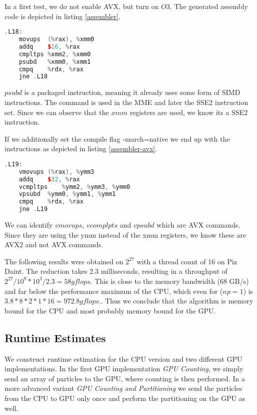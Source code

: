 \documentclass[]{article}
\begin{document}
In a first test, we do not enable AVX, but turn on $O3$. The generated assembly code is depicted in listing \ref{assembler}.

\begin{lstlisting}[language=c++, caption=Reduction Assembler Code without AVX, label=assembler]
.L18:
	movups	(%rax), %xmm0
	addq	$16, %rax
	cmpltps	%xmm2, %xmm0
	psubd	%xmm0, %xmm1
	cmpq	%rdx, %rax
	jne	.L18

\end{lstlisting}

$psubd$ is a packaged instruction, meaning it already uses some form of SIMD instructions. The command is used in the MME and later the SSE2 instruction set. Since we can observe that the $xmm$ registers are used, we know its a SSE2 instruction. 

If we additionally set the compile flag -march=native we end up with the instructions as depicted in listing \ref{assembler-avx}.

\begin{lstlisting}[language=c++, caption=Reduction Assembler Code with AVX2, label=assembler-avx]
.L19:
	vmovups	(%rax), %ymm3
	addq	$32, %rax
	vcmpltps	%ymm2, %ymm3, %ymm0
	vpsubd	%ymm0, %ymm1, %ymm1
	cmpq	%rdx, %rax
	jne	.L19	

\end{lstlisting}

We can identify $vmovups$, $vcomplpts$ and $vpsubd$ which are AVX commands. Since they are using the ymm instead of the xmm registers, we know these are AVX2 and not AVX commands.

The following results were obtained on $2^{27}$ with a thread count of 16 on Piz Daint. The reduction takes 2.3 milliseconds, resulting in a throughput of $2^{27} / 10^{9} * 10^3 / 2.3 = 58 gflops$. This is close to the memory bandwidth (68 GB/s) and far below the performance maximum of the CPU, which even for ($np = 1$) is $3.8 * 8 * 2 * 1 * 16 = 972.8 gflops.$. Thus we conclude that the algorithm is memory bound for the CPU and most probably memory bound for the GPU. 


\subsection{Runtime Estimates}

We construct runtime estimation for the CPU version and two different GPU implementations. In the first GPU implementation \textit{GPU Counting}, we simply send an array of particles to the GPU, where counting is then performed. In a more advanced variant \textit{GPU Counting and Partitioning} we send the particles from the CPU to GPU only once and perform the partitioning on the GPU as well.  
\end{document}
